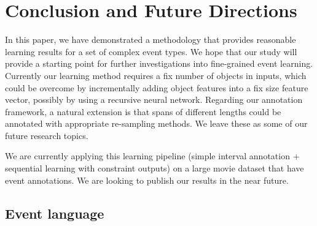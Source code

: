 \documentclass{esann}
\begin{document}
\section{Conclusion and Future Directions}

In this paper, we have demonstrated a methodology that provides  reasonable learning results for a set of complex event types. We hope that our study will provide a starting point for further investigations into fine-grained event learning.
%
Currently our learning method requires a fix number of objects in inputs, which could be overcome by incrementally adding object features into a fix size feature vector, possibly by using a recursive neural network. Regarding our annotation framework, a natural extension is that spans of different lengths could be annotated with appropriate re-sampling methods. We  leave these as some of our future research topics.

We are currently applying this learning pipeline (simple interval annotation + sequential learning with constraint outputs) on a large movie dataset that have event annotations. We are looking to publish our results in the near future.

\iffalse
I have to put this at the beginning of the page (in footnotes) because they allow 6 pages only.

\section*{Acknowledgements} 
  \label{sec:acknowledgements}
This work is supported by a contract with the US Defense Advanced Research Projects Agency (DARPA), Contract W911NF-15-C-0238.
 Approved for Public Release, Distribution Unlimited. The views expressed are those of the authors and do not reflect the official policy or position of the Department of Defense or the U.S. Government.  We would like to thank Nikhil Krishnaswamy and
Keigh Rim for their discussion and input on this topic.  All errors and mistakes are, of course, the responsibilities of the authors.
\fi
 
\iffalse
\subsection{Event language}
\end{document}
